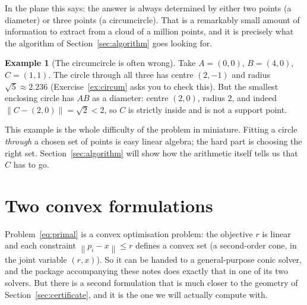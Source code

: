 \documentclass[11pt,a4paper]{article}
\theoremstyle{plain}
\theoremstyle{definition}
\newtheorem{example}[theorem]{Example}
\theoremstyle{remark}
\newcommand{\norm}[1]{\left\lVert #1 \right\rVert}
\begin{document}
In the plane this says: the answer is always determined by either two points (a
diameter) or three points (a circumcircle). That is a remarkably small amount of
information to extract from a cloud of a million points, and it is precisely what
the algorithm of Section~\ref{sec:algorithm} goes looking for.

\begin{example}[The circumcircle is often wrong]
  \label{ex:obtuse}
  Take $A=(0,0)$, $B=(4,0)$, $C=(1,1)$. The circle through all three has centre
  $(2,-1)$ and radius $\sqrt5\approx2.236$ (Exercise~\ref{ex:circum} asks you to
  check this). But the smallest enclosing circle has $AB$ as a diameter: centre
  $(2,0)$, radius $2$, and indeed $\norm{C-(2,0)}=\sqrt2<2$, so $C$ is strictly
  inside and is not a support point.

  \begin{center}
  \end{center}

  This example is the whole difficulty of the problem in miniature. Fitting a
  circle \emph{through} a chosen set of points is easy linear algebra; the hard
  part is choosing the right set. Section~\ref{sec:algorithm} will show how the
  arithmetic itself tells us that $C$ has to go.
\end{example}

\section{Two convex formulations}
\label{sec:convex}

Problem~\eqref{eq:primal} is a convex optimisation problem: the objective $r$ is
linear and each constraint $\norm{p_i-x}\le r$ defines a convex set (a
second-order cone, in the joint variable $(r,x)$). So it can be handed to a
general-purpose conic solver, and the package accompanying these notes does
exactly that in one of its two solvers. But there is a second formulation that is
much closer to the geometry of Section~\ref{sec:certificate}, and it is the one
we will actually compute with.
\end{document}
